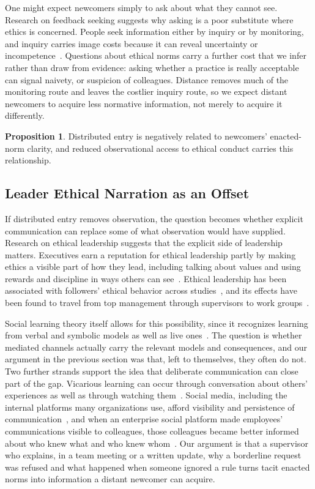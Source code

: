 \documentclass[12pt,a4paper]{article}
\theoremstyle{definition}
\newtheorem{proposition}{Proposition}
\begin{document}
One might expect newcomers simply to ask about what they cannot see. Research on feedback seeking suggests why asking is a poor substitute where ethics is concerned. People seek information either by inquiry or by monitoring, and inquiry carries image costs because it can reveal uncertainty or incompetence~\citep{ashford2003reflections}. Questions about ethical norms carry a further cost that we infer rather than draw from evidence: asking whether a practice is really acceptable can signal naivety, or suspicion of colleagues. Distance removes much of the monitoring route and leaves the costlier inquiry route, so we expect distant newcomers to acquire less normative information, not merely to acquire it differently.

\begin{proposition}
Distributed entry is negatively related to newcomers' enacted-norm clarity, and reduced observational access to ethical conduct carries this relationship.
\end{proposition}

\subsection{Leader Ethical Narration as an Offset}

If distributed entry removes observation, the question becomes whether explicit communication can replace some of what observation would have supplied. Research on ethical leadership suggests that the explicit side of leadership matters. Executives earn a reputation for ethical leadership partly by making ethics a visible part of how they lead, including talking about values and using rewards and discipline in ways others can see~\citep{trevino2000moral}. Ethical leadership has been associated with followers' ethical behavior across studies~\citep{bedi2016meta}, and its effects have been found to travel from top management through supervisors to work groups~\citep{mayer2009how}.

Social learning theory itself allows for this possibility, since it recognizes learning from verbal and symbolic models as well as live ones~\citep{bandura1977social}. The question is whether mediated channels actually carry the relevant models and consequences, and our argument in the previous section was that, left to themselves, they often do not. Two further strands support the idea that deliberate communication can close part of the gap. Vicarious learning can occur through conversation about others' experiences as well as through watching them~\citep{myers2018coactive}. Social media, including the internal platforms many organizations use, afford visibility and persistence of communication~\citep{treem2013social}, and when an enterprise social platform made employees' communications visible to colleagues, those colleagues became better informed about who knew what and who knew whom~\citep{leonardi2015ambient}. Our argument is that a supervisor who explains, in a team meeting or a written update, why a borderline request was refused and what happened when someone ignored a rule turns tacit enacted norms into information a distant newcomer can acquire.
\end{document}

